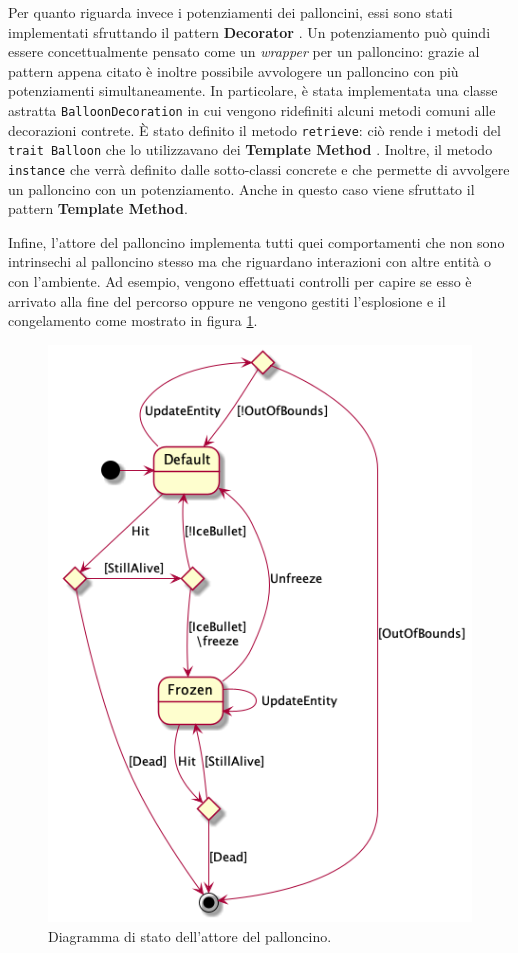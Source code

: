 

Per quanto riguarda invece i potenziamenti dei palloncini, essi sono stati implementati sfruttando il pattern
\textbf{Decorator} \cite{gof}. Un potenziamento può quindi essere concettualmente pensato come un \textit{wrapper} per un
palloncino: grazie al pattern appena citato è inoltre possibile avvologere un palloncino con più potenziamenti
simultaneamente. In particolare, è stata implementata una classe astratta \texttt{BalloonDecoration} in cui vengono
ridefiniti alcuni metodi comuni alle decorazioni contrete. È stato definito il metodo \texttt{retrieve}: ciò rende i
metodi del \texttt{trait Balloon} che lo utilizzavano dei \textbf{Template Method} \cite{gof}. Inoltre, il metodo
\texttt{instance} che verrà definito dalle sotto-classi concrete e che permette di avvolgere un palloncino con un
potenziamento. Anche in questo caso viene sfruttato il pattern \textbf{Template Method}.

Infine, l'attore del palloncino implementa tutti quei comportamenti che non sono intrinsechi al palloncino stesso ma che
riguardano interazioni con altre entità o con l'ambiente. Ad esempio, vengono effettuati controlli per capire se esso è
arrivato alla fine del percorso oppure ne vengono gestiti l'esplosione e il congelamento come mostrato in figura
\ref{fig:state-balloon-actor}.

\begin{figure}[H]
    \centering
    \includegraphics[width=.5\linewidth]{img/state-balloon-actor}
    \caption{Diagramma di stato dell'attore del palloncino.}
    \label{fig:state-balloon-actor}
\end{figure}

